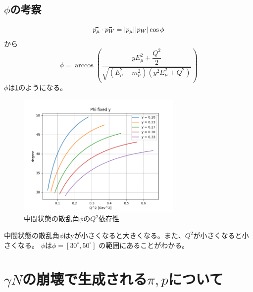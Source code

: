 \subsection{$\phi$の考察}
\begin{equation}
    \vec{p_\mu} \cdot \vec{p_W} = |p_\mu| |p_W| \\ \cos\phi
\end{equation}
から
\begin{equation}
    \phi = \arccos{(\dfrac{yE^2_\mu + \dfrac{Q^2}{2}} {\sqrt{(E^2_\mu - m^2_\mu)(y^2E^2_\mu+Q^2)}} ) }
\end{equation}
$\phi$は\ref{fig:angle4}のようになる。
\begin{figure}[H]
    \centering
    \includegraphics[width=8cm]{img/Phi_degree_fixed_y.png}
    \caption{中間状態の散乱角$\phi$の$Q^2$依存性}
    \label{fig:angle4}
\end{figure}
中間状態の散乱角$\phi$はyが小さくなると大きくなる。また、$Q^2$が小さくなると小さくなる。
$\phi$は$\phi = [30^\circ, 50^\circ]$ の範囲にあることがわかる。

\section{\texorpdfstring{$\gamma N$の崩壊で生成される$\pi, p$について}{LG}}
